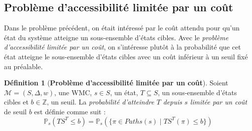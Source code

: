 \documentclass[12pt,a4paper]{report}
\theoremstyle{definition}%
\newtheorem{definition}{Définition}[chapter]
\theoremstyle{remark}
\newcommand{\pr}{\mathbb{P}}
\begin{document}
\subsection{Problème d'accessibilité limitée par un coût}
Dans le problème précédent, on était intéressé par le coût attendu pour qu'un état du système atteigne un sous-ensemble d'états cibles. Avec le \textit{problème d'accessibilité limitée par un coût}, on s'intéresse plutôt à la probabilité que cet état atteigne le sous-ensemble d'états cibles avec un coût inférieur à un seuil fixé au préalable.

\begin{definition}[\textbf{Problème d'accessibilité limitée par un coût}]
	Soient $\mathcal{M} = (S, \Delta, w)$, une WMC, $s \in S$, un état, $T \subseteq S$, un sous-ensemble d'états cibles et $b \in \mathbb{Z}$, un seuil. La \textit{probabilité d'atteindre $T$ depuis $s$ limitée par un coût} de seuil $b$ est définie comme suit : 
	\[\pr_s(TS^T \leq b) = \pr_s(\{\pi \in Paths(s) \; | \; TS^T(\pi) \leq b \}) \]
\end{definition}

{}

\end{document}
